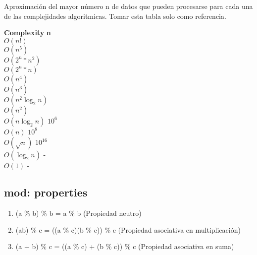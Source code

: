 \documentclass[11pt,letterpaper,twocolumn,twosided]{article}
\begin{document}
Aproximaci\'on del mayor n\'umero n de datos que pueden procesarse para cada una de las complejidades algoritmicas. Tomar esta tabla solo como referencia.

\begin{tabbing}
\textbf{Complexity}\hspace{4cm} \=  \textbf{n}\hspace{3cm}   \\ 
$O(n!)$ \\ 
$O(n^{5})$ \\ 
$O(2^{n}*n^{2})$ \\ 
$O(2^{n}*n)$ \\ 
$O(n^{4})$ \\ 
$O(n^{3})$ \\ 
$O(n^{2}\log_{2}n)$ \\ 
$O(n^{2})$ \\ 
$O(n\log_{2}n)$ \> $10^{6}$\\ 
$O(n)$ \> $10^{8}$\\ 
$O(\sqrt{n})$ \> $10^{16}$\\ 
$O(\log_{2}n)$ \> -\\ 
$O(1)$ \> -\\ 
\end{tabbing}

\subsection{mod: properties}

\begin{enumerate}
\item (a \% b) \% b = a \% b (Propiedad neutro)
\item (ab) \% c = ((a \% c)(b \% c)) \% c (Propiedad asociativa en multiplicaci\'on)
\item (a + b) \% c = ((a \% c) + (b \% c)) \% c (Propiedad asociativa en suma)
\end{enumerate}
\end{document}
